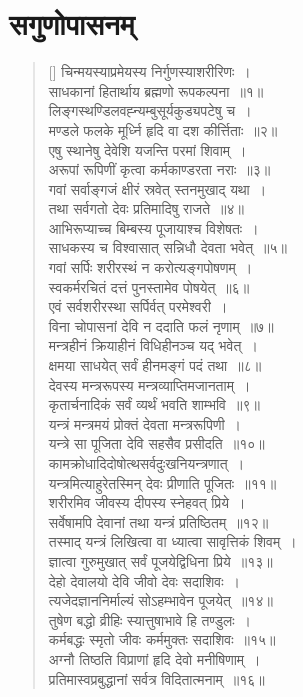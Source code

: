 \documentclass[twoside,12pt,notitlepage]{book}
\begin{document}
\section{सगुणोपासनम्}
\begin{verse}[\versewidth]
चिन्मयस्याप्रमेयस्य निर्गुणस्याशरीरिणः~।\\[-6pt]
साधकानां हितार्थाय ब्रह्मणो रूपकल्पना~॥१॥\\
लिङ्गस्थण्डिलवह्न्यम्बुसूर्यकुड्यपटेषु च~।\\[-6pt]
मण्डले फलके मूर्ध्नि हृदि वा दश कीर्त्तिताः~॥२॥\\
एषु स्थानेषु देवेशि यजन्ति परमां शिवाम्~।\\[-6pt]
अरूपां रूपिणीं कृत्वा कर्मकाण्डरता नराः~॥३॥\\
गवां सर्वाङ्गजं क्षीरं स्रवेत् स्तनमुखाद् यथा~।\\[-6pt]
तथा सर्वगतो देवः प्रतिमादिषु राजते~॥४॥\\
आभिरूप्याच्च बिम्बस्य पूजायाश्च विशेषतः~।\\[-6pt]
साधकस्य च विश्वासात् सन्निधौ देवता भवेत्~॥५॥\\
गवां सर्पिः शरीरस्थं न  करोत्यङ्गपोषणम्~।\\[-6pt]
स्वकर्मरचितं दत्तं पुनस्तामेव पोषयेत्~॥६॥\\
एवं सर्वशरीरस्था सर्पिर्वत् परमेश्वरी~।\\[-6pt]
विना चोपासनां देवि न ददाति फलं नृणाम्~॥७॥\\
मन्त्रहीनं क्रियाहीनं विधिहीनञ्च यद् भवेत्~।\\[-6pt]
क्षमया साधयेत् सर्वं हीनमङ्गं पदं तथा~॥८॥\\
देवस्य  मन्त्ररूपस्य मन्त्रव्याप्तिमजानताम्~।\\[-6pt]
कृतार्चनादिकं सर्वं व्यर्थं भवति शाम्भवि~॥९॥ \\
यन्त्रं मन्त्रमयं प्रोक्तं देवता मन्त्ररूपिणी~।\\[-6pt]
यन्त्रे सा पूजिता देवि सहसैव प्रसीदति~॥१०॥\\
कामक्रोधादिदोषोत्थसर्वदुःखनियन्त्रणात्~।\\[-6pt]
यन्त्रमित्याहुरेतस्मिन् देवः प्रीणाति पूजितः~॥११॥\\
शरीरमिव जीवस्य दीपस्य स्नेहवत् प्रिये~।\\[-6pt]
सर्वेषामपि देवानां तथा यन्त्रं प्रतिष्ठितम्~॥१२॥\\
तस्माद् यन्त्रं  लिखित्वा वा ध्यात्वा सावृत्तिकं शिवम्~।\\[-6pt]
ज्ञात्वा गुरुमुखात् सर्वं पूजयेद्विधिना प्रिये~॥१३॥\footA \\
देहो देवालयो देवि जीवो देवः सदाशिवः~।\\[-6pt]
त्यजेदज्ञाननिर्माल्यं सोऽहम्भावेन पूजयेत्~॥१४॥\\
तुषेण बद्धो व्रीहिः स्यात्तुषाभावे हि तण्डुलः~।\\[-6pt]
कर्मबद्धः स्मृतो जीवः कर्ममुक्तः सदाशिवः~॥१५॥\\
अग्नौ तिष्ठति विप्राणां  हृदि देवो मनीषिणाम्~।\\[-6pt]
प्रतिमास्वप्रबुद्धानां सर्वत्र विदितात्मनाम्~॥१६॥
\end{verse}
\end{document}
